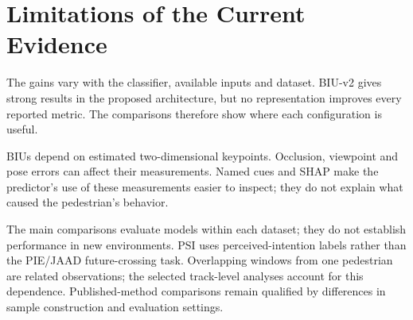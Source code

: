 \FloatBarrier
\section{Limitations of the Current Evidence}\label{sec:ch4_limits}

The gains vary with the classifier, available inputs and dataset. BIU-v2 gives strong
results in the proposed architecture, but no representation improves every reported
metric. The comparisons therefore show where each configuration is useful.

BIUs depend on estimated two-dimensional keypoints. Occlusion, viewpoint and pose
errors can affect their measurements. Named cues and SHAP make the predictor's use
of these measurements easier to inspect; they do not explain what caused the
pedestrian's behavior.

The main comparisons evaluate models within each dataset; they do not establish
performance in new environments. PSI uses perceived-intention labels rather
than the PIE/JAAD future-crossing task. Overlapping windows from one pedestrian are
related observations; the selected track-level analyses account for this dependence.
Published-method comparisons remain qualified by differences in sample construction
and evaluation settings.
\clearpage
